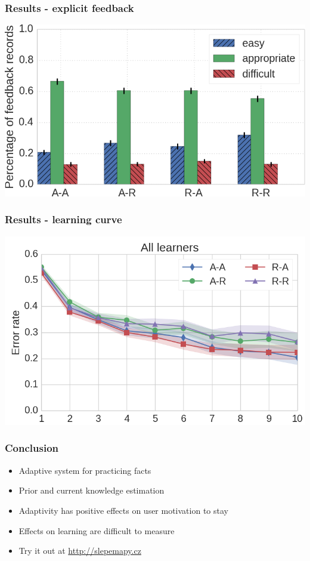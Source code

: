 \documentclass[xcolor=svgnames]{beamer}
\begin{document}
\begin{frame}
	\frametitle{Results - explicit feedback}
   \includegraphics[width=\textwidth]{img/feedback.png}
\end{frame}
\begin{frame}
	\frametitle{Results - learning curve}
   \includegraphics[width=\textwidth]{img/learning_curves_all.png}
\end{frame}
\begin{frame}
	\frametitle{Conclusion}
  \begin{itemize}
    \item Adaptive system for practicing facts 
    \item Prior and current knowledge estimation
    \item Adaptivity has positive effects on user motivation to stay
    \item Effects on learning are difficult to measure
    \item Try it out at \url{http://slepemapy.cz}
    \
  \end{itemize}
\end{frame}
\end{document}
